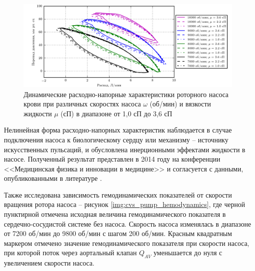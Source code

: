 \begin{figure}[ht] 
  \center
  \includegraphics [scale=1.0] {../images/c2_dynamic_model_final}
  \caption{Динамические расходно-напорные характеристики роторного насоса крови при различных скоростях насоса $\omega$ (об/мин) и вязкости жидкости $\mu$ (сП) в диапазоне от 1,0 сП до 3,6 сП} 
  \label{img:dynamic_hqs}  
\end{figure}

Нелинейная форма расходно-напорных характеристик наблюдается в случае подключения насоса к биологическому сердцу или механизму -- источнику искусственных пульсаций, и обусловлена инерционными эффектами жидкости в насосе.
Полученный результат представлен в 2014 году на конференции <<Медицинская физика и инновации в медицине>> \cite{tkmf_2014} и согласуется с данными, опубликованными в литературе \cite{Moscato_2009, stanfield_vitro_2013, Pirbodaghi_2011,Thorsten_1996,Vollkron_2002,Pennings_2013,HQ_s_d_2015}.

Также исследована зависимость гемодинамических показателей от скорости вращения ротора насоса -- рисунок \ref{img:cvs_pump_hemodynamics}, где черной пунктирной отмечена исходная величина гемодинамического показателя в сердечно-сосудистой системе без насоса. Скорость насоса изменялась в диапазоне от 7200 об/мин до 9800 об/мин с шагом 200 об/мин. Красным квадратным маркером отмечено значение гемодинамического показателя при скорости насоса, при которой поток через аортальный клапан $Q_{AV}$ уменьшается до нуля с увеличением скорости насоса.

